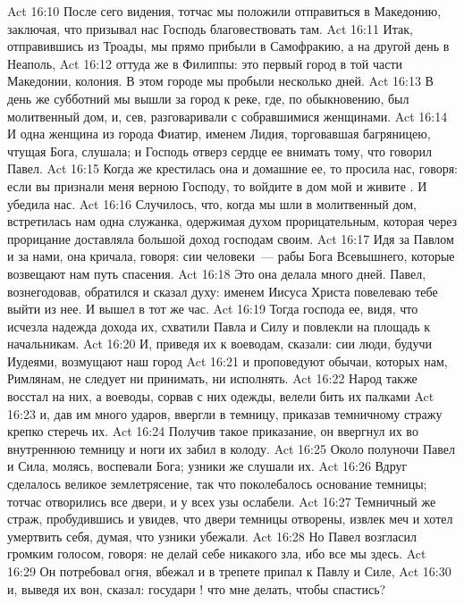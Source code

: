 \vs Act 16:10 После сего видения, тотчас мы положили отправиться в Македонию, заключая, что призывал нас Господь благовествовать там.
\rsbpar\vs Act 16:11 Итак, отправившись из Троады, мы прямо прибыли в Самофракию, а на другой день в Неаполь,
\vs Act 16:12 оттуда же в Филиппы: это первый город в той части Македонии, колония. В этом городе мы пробыли несколько дней.
\vs Act 16:13 В день же субботний мы вышли за город к реке, где, по обыкновению, был молитвенный дом, и, сев, разговаривали с собравшимися  женщинами.
\vs Act 16:14 И одна женщина из города Фиатир, именем Лидия, торговавшая багряницею, чтущая Бога, слушала; и Господь отверз сердце ее внимать тому, что говорил Павел.
\vs Act 16:15 Когда же крестилась она и домашние ее, то просила нас, говоря: если вы признали меня верною Господу, то войдите в дом мой и живите . И убедила нас.
\rsbpar\vs Act 16:16 Случилось, что, когда мы шли в молитвенный дом, встретилась нам одна служанка, одержимая духом прорицательным, которая через прорицание доставляла большой доход господам своим.
\vs Act 16:17 Идя за Павлом и за нами, она кричала, говоря: сии человеки~--- рабы Бога Всевышнего, которые возвещают нам путь спасения.
\vs Act 16:18 Это она делала много дней. Павел, вознегодовав, обратился и сказал духу: именем Иисуса Христа повелеваю тебе выйти из нее. И  вышел в тот же час.
\vs Act 16:19 Тогда господа ее, видя, что исчезла надежда дохода их, схватили Павла и Силу и повлекли на площадь к начальникам.
\vs Act 16:20 И, приведя их к воеводам, сказали: сии люди, будучи Иудеями, возмущают наш город
\vs Act 16:21 и проповедуют обычаи, которых нам, Римлянам, не следует ни принимать, ни исполнять.
\vs Act 16:22 Народ также восстал на них, а воеводы, сорвав с них одежды, велели бить их палками
\vs Act 16:23 и, дав им много ударов, ввергли в темницу, приказав темничному стражу крепко стеречь их.
\vs Act 16:24 Получив такое приказание, он ввергнул их во внутреннюю темницу и ноги их забил в колоду.
\rsbpar\vs Act 16:25 Около полуночи Павел и Сила, молясь, воспевали Бога; узники же слушали их.
\vs Act 16:26 Вдруг сделалось великое землетрясение, так что поколебалось основание темницы; тотчас отворились все двери, и у всех узы ослабели.
\vs Act 16:27 Темничный же страж, пробудившись и увидев, что двери темницы отворены, извлек меч и хотел умертвить себя, думая, что узники убежали.
\vs Act 16:28 Но Павел возгласил громким голосом, говоря: не делай себе никакого зла, ибо все мы здесь.
\vs Act 16:29 Он потребовал огня, вбежал  и в трепете припал к Павлу и Силе,
\vs Act 16:30 и, выведя их вон, сказал: государи ! что мне делать, чтобы спастись?
